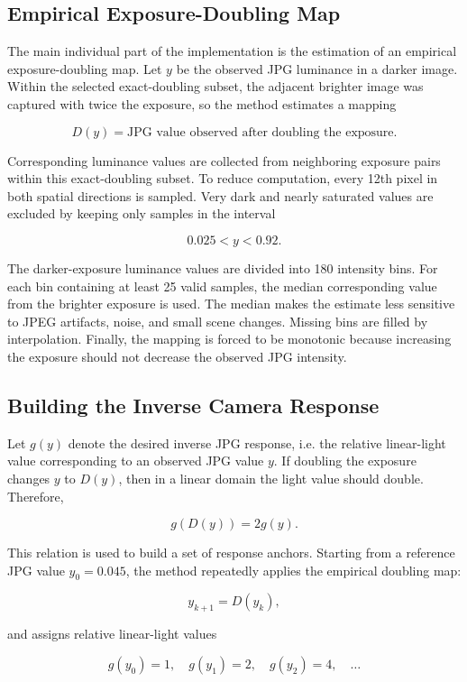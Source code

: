 \documentclass[11pt,a4paper]{article}
\begin{document}
\subsection{Empirical Exposure-Doubling Map}

The main individual part of the implementation is the estimation of an empirical exposure-doubling map. Let $y$ be the observed JPG luminance in a darker image. Within the selected exact-doubling subset, the adjacent brighter image was captured with twice the exposure, so the method estimates a mapping

\[
D(y) = \text{JPG value observed after doubling the exposure}.
\]

Corresponding luminance values are collected from neighboring exposure pairs within this exact-doubling subset. To reduce computation, every 12th pixel in both spatial directions is sampled. Very dark and nearly saturated values are excluded by keeping only samples in the interval

\[
0.025 < y < 0.92.
\]

The darker-exposure luminance values are divided into 180 intensity bins. For each bin containing at least 25 valid samples, the median corresponding value from the brighter exposure is used. The median makes the estimate less sensitive to JPEG artifacts, noise, and small scene changes. Missing bins are filled by interpolation. Finally, the mapping is forced to be monotonic because increasing the exposure should not decrease the observed JPG intensity.

\subsection{Building the Inverse Camera Response}

Let $g(y)$ denote the desired inverse JPG response, i.e. the relative linear-light value corresponding to an observed JPG value $y$. If doubling the exposure changes $y$ to $D(y)$, then in a linear domain the light value should double. Therefore,

\[
g(D(y)) = 2g(y).
\]

This relation is used to build a set of response anchors. Starting from a reference JPG value $y_0=0.045$, the method repeatedly applies the empirical doubling map:

\[
y_{k+1}=D(y_k),
\]

and assigns relative linear-light values

\[
g(y_0)=1,\quad g(y_1)=2,\quad g(y_2)=4,\quad \ldots
\]
\end{document}
